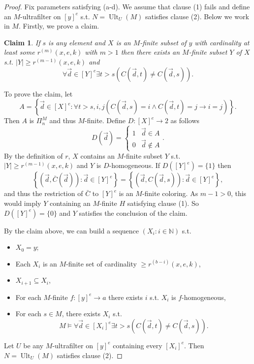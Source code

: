 \documentclass[twoside,a4paper]{amsart}
\newtheorem{claim}[theorem]{Claim}
\theoremstyle{definition}
\theoremstyle{theorem}
\numberwithin{equation}{section}
\newcommand{\<}{\langle}
\renewcommand{\>}{\rangle}
\newcommand{\Ult}{\operatorname{Ult}}
\begin{document}
\begin{proof}
Fix parameters satisfying (a-d).
We assume that clause (1) fails and 
define an $M$-ultrafilter on $[y]^e$ s.t. $N = \Ult_U(M)$ satisfies clause (2).
Below we work in $M$.
Firstly, we prove a claim.

\medskip

\begin{claim}
If $s$ is any element and
$X$ is an $M$-finite subset of $y$ with cardinality at least some $r^{(m)}(x,e,k)$ with $m > 1$
then there exists an $M$-finite subset $Y$ of $X$ s.t.
$|Y| \geq r^{(m-1)}(x,e,k)$ and
\[
  \forall \vec{d} \in [Y]^e \exists t > s (C(\vec{d},t) \neq C(\vec{d},s)).
\]
\end{claim}

To prove the claim, let
\[
  A = \left\{ \vec{d} \in [X]^e: \forall t > s, i,j
    \left( C(\vec{d},s) = i \wedge C(\vec{d},t) = j \to i = j \right) \right\}.
\]
Then $A$ is $\Pi_n^M$ and thus $M$-finite.
Define $D: [X]^e \to 2$ as follows
\[
  D(\vec{d}) =
  \begin{cases}
    1 & \vec{d} \in A \\
    0 & \vec{d} \not\in A
  \end{cases}.
\]
By the definition of $r$, 
$X$ contains an $M$-finite subset $Y$ s.t. $|Y| \geq r^{(m-1)}(x,e,k)$ and $Y$ is $D$-homogeneous.
If $D([Y]^e) = \{1\}$ then
\[
  \left\{ (\vec{d},\bar{C}(\vec{d})): \vec{d} \in [Y]^e \right\} =
  \left\{ (\vec{d},C(\vec{d},s)): \vec{d} \in [Y]^e \right\},
\]
and thus the restriction of $\bar{C}$ to $[Y]^e$ is an $M$-finite coloring.
As $m-1 > 0$, this would imply $Y$ containing an $M$-finite $H$ satisfying clause (1).
So $D([Y]^e) = \{0\}$ and $Y$ satisfies the conclusion of the claim.

\medskip

By the claim above, we can build a sequence $(X_i: i \in \mathbb{N})$ s.t.
\begin{itemize}
 \item $X_0 = y$;
 \item Each $X_i$ is an $M$-finite set of cardinality $\geq r^{(b-i)}(x,e,k)$,
 \item $X_{i+1} \subseteq X_i$,
 \item For each $M$-finite $f: [y]^e \to a$ 
 there exists $i$ s.t. $X_i$ is $f$-homogeneous,
 \item For each $s \in M$, there exists $X_i$ s.t.
 \[
    M \models \forall \vec{d} \in [X_i]^e \exists t > s (C(\vec{d},t) \neq C(\vec{d},s)).
 \]
\end{itemize}
Let $U$ be any $M$-ultrafilter on $[y]^e$ containing every $[X_i]^e$.
Then $N = \Ult_U(M)$ satisfies clause (2).
\end{proof}
\end{document}
